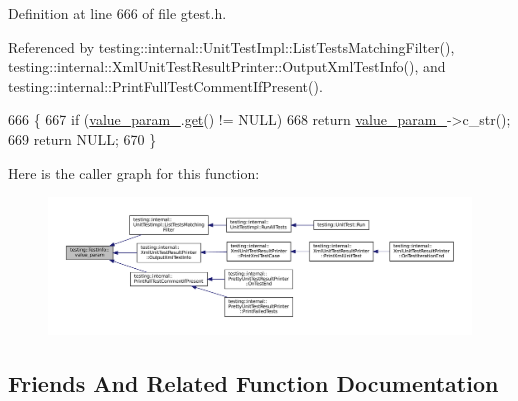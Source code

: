 Definition at line 666 of file gtest.\+h.



Referenced by testing\+::internal\+::\+Unit\+Test\+Impl\+::\+List\+Tests\+Matching\+Filter(), testing\+::internal\+::\+Xml\+Unit\+Test\+Result\+Printer\+::\+Output\+Xml\+Test\+Info(), and testing\+::internal\+::\+Print\+Full\+Test\+Comment\+If\+Present().


\begin{DoxyCode}
666                                   \{
667     \textcolor{keywordflow}{if} (\hyperlink{classtesting_1_1TestInfo_ac3dd68ea96ebe82c6eab31e6e730a918}{value\_param\_}.\hyperlink{classtesting_1_1internal_1_1scoped__ptr_aa5984291e12453f1e81b7676d1fa26fd}{get}() != NULL)
668       \textcolor{keywordflow}{return} \hyperlink{classtesting_1_1TestInfo_ac3dd68ea96ebe82c6eab31e6e730a918}{value\_param\_}->c\_str();
669     \textcolor{keywordflow}{return} NULL;
670   \}
\end{DoxyCode}
Here is the caller graph for this function\+:
\nopagebreak
\begin{figure}[H]
\begin{center}
\leavevmode
\includegraphics[width=350pt]{classtesting_1_1TestInfo_abdf2c6cfcf4819e725816c64e1c1fc24_icgraph}
\end{center}
\end{figure}


\subsection{Friends And Related Function Documentation}
\mbox{\label{classtesting_1_1TestInfo_a70ddf8a12d8c05f17429f6381abc8ace}} 
